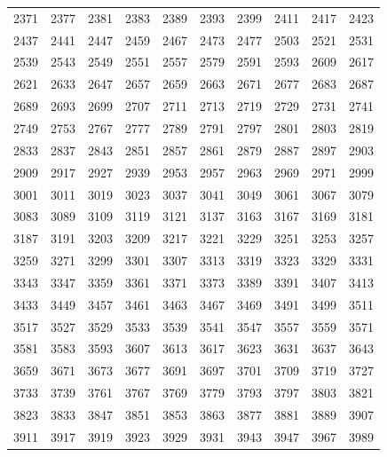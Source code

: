 \documentclass{article}
\begin{document}
\begin{tabular}{ccccccccc}
2371 & 2377 & 2381 & 2383 & 2389 & 2393 & 2399 & 2411 & 2417 & 2423 \\
2437 & 2441 & 2447 & 2459 & 2467 & 2473 & 2477 & 2503 & 2521 & 2531 \\
2539 & 2543 & 2549 & 2551 & 2557 & 2579 & 2591 & 2593 & 2609 & 2617 \\
2621 & 2633 & 2647 & 2657 & 2659 & 2663 & 2671 & 2677 & 2683 & 2687 \\
2689 & 2693 & 2699 & 2707 & 2711 & 2713 & 2719 & 2729 & 2731 & 2741 \\
2749 & 2753 & 2767 & 2777 & 2789 & 2791 & 2797 & 2801 & 2803 & 2819 \\
2833 & 2837 & 2843 & 2851 & 2857 & 2861 & 2879 & 2887 & 2897 & 2903 \\
2909 & 2917 & 2927 & 2939 & 2953 & 2957 & 2963 & 2969 & 2971 & 2999 \\
3001 & 3011 & 3019 & 3023 & 3037 & 3041 & 3049 & 3061 & 3067 & 3079 \\
3083 & 3089 & 3109 & 3119 & 3121 & 3137 & 3163 & 3167 & 3169 & 3181 \\
3187 & 3191 & 3203 & 3209 & 3217 & 3221 & 3229 & 3251 & 3253 & 3257 \\
3259 & 3271 & 3299 & 3301 & 3307 & 3313 & 3319 & 3323 & 3329 & 3331 \\
3343 & 3347 & 3359 & 3361 & 3371 & 3373 & 3389 & 3391 & 3407 & 3413 \\
3433 & 3449 & 3457 & 3461 & 3463 & 3467 & 3469 & 3491 & 3499 & 3511 \\
3517 & 3527 & 3529 & 3533 & 3539 & 3541 & 3547 & 3557 & 3559 & 3571 \\
3581 & 3583 & 3593 & 3607 & 3613 & 3617 & 3623 & 3631 & 3637 & 3643 \\
3659 & 3671 & 3673 & 3677 & 3691 & 3697 & 3701 & 3709 & 3719 & 3727 \\
3733 & 3739 & 3761 & 3767 & 3769 & 3779 & 3793 & 3797 & 3803 & 3821 \\
3823 & 3833 & 3847 & 3851 & 3853 & 3863 & 3877 & 3881 & 3889 & 3907 \\
3911 & 3917 & 3919 & 3923 & 3929 & 3931 & 3943 & 3947 & 3967 & 3989
\end{tabular}

\newpage

\end{document}
